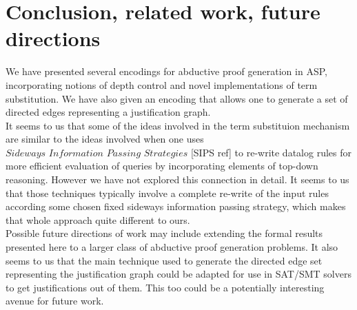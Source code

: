 \section{ Conclusion, related work, future directions}\label{sec:conclusion}
We have presented several encodings for abductive proof generation in ASP, incorporating notions of depth control and  novel implementations of term substitution. We have also given an encoding that allows one to generate a set of directed edges representing a justification graph.\\It seems to us that some of the ideas involved in the term substituion mechanism are similar to the ideas involved when one uses $\textit{Sideways Information Passing Strategies}$ [SIPS ref] to re-write datalog rules for more efficient evaluation of queries by incorporating elements of top-down reasoning. However we have not explored this connection in detail. It seems to us that those techniques typically involve a complete re-write of the input rules according some chosen fixed sideways information passing strategy, which makes that whole approach quite different to ours.\\ Possible future directions of work may include extending the formal results presented here to a larger class of abductive proof generation problems. It also seems to us that the main technique used to generate the directed edge set representing the justification graph could be adapted for use in SAT/SMT solvers to get justifications out of them. This too could be a potentially interesting avenue for future work. 




